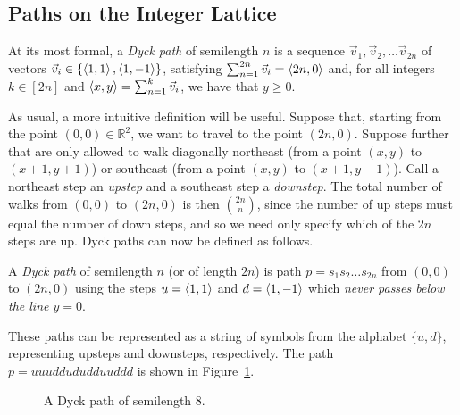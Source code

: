   \subsection{Paths on the Integer Lattice}
    
    At its most formal, a \emph{Dyck path} of semilength $n$ is a sequence
    $\vec v_1, \vec v_2, \dots \vec v_{2n}$ of vectors $ \vec v_i \in
    \{\left\langle 1,1 \right\rangle, \left\langle 1,-1 \right\rangle\}$, satisfying $ \sum_{n=1}^{2n} \vec v_i =
    \left\langle 2n, 0 \right\rangle$ and, for all integers $k \in [2n]$ and $\left\langle x,y \right\rangle =
    \sum_{n=1}^k \vec v_i$, we have that $y \geq 0$. 

    As usual, a more intuitive definition will be useful. 
    Suppose that, starting from the point $(0,0) \in \mathbb{R}^2$, we want to
    travel to the point $(2n,0)$. Suppose further that are only allowed to walk
    diagonally northeast 
    (from a point $(x,y)$ to $(x+1, y+1)$) or southeast (from a point $(x,y)$
    to $(x+1, y-1)$). 
    Call a northeast step an \emph{upstep} and a southeast step a
    \emph{downstep}. The total number of walks from $(0,0)$ to $(2n,0)$ is then
    $\binom{2n}{n}$, since the number of up steps must equal the number of down
    steps, and so we need only specify which of the $2n$ steps are up. Dyck
    paths can now be defined as follows. 

    \begin{definition}\label{prelim:def:dyckpath}
      A \emph{Dyck path} of semilength $n$ (or of length $2n$) is path $p =
      s_1s_2 \dots s_{2n}$ from $(0,0)$ to $(2n,0)$ using the steps $u =
      \left\langle 1,1 \right\rangle$ and $d = \left\langle 1,-1 \right\rangle$ which \emph{never passes below the
      line $y=0$}. 
    \end{definition}

    These paths can be represented as a string of symbols from the alphabet
    $\{u,d\}$, representing upsteps and downsteps, respectively. The path $p =
    uuuddududduuddd$ is shown in Figure~\ref{prelim:fig:dyckpath}. 

    \begin{figure}[t]\centering
      \caption{A Dyck path of semilength $8$.}
      \label{prelim:fig:dyckpath}
    \end{figure}

